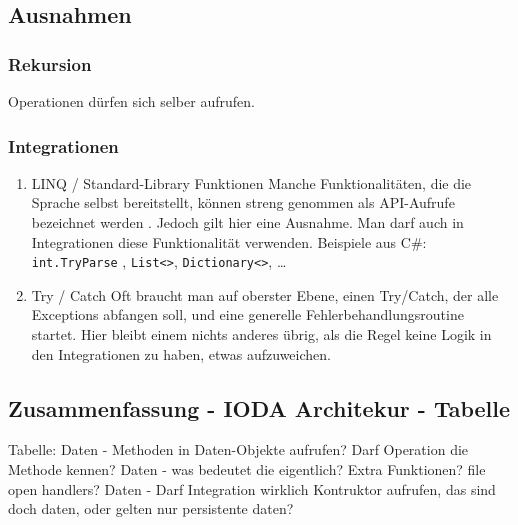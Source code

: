 \documentclass[11pt]{article}
\begin{document}
\subsection{Ausnahmen}
\label{sec:orgheadline41}
\subsubsection{Rekursion}
\label{sec:orgheadline37}
Operationen dürfen sich selber aufrufen.
\subsubsection{Integrationen}
\label{sec:orgheadline40}

\begin{enumerate}
\item LINQ / Standard-Library Funktionen
\label{sec:orgheadline38}
Manche Funktionalitäten, die die Sprache selbst bereitstellt, können streng genommen als API-Aufrufe bezeichnet werden
. Jedoch gilt hier eine Ausnahme. Man darf auch in Integrationen diese Funktionalität verwenden.
Beispiele aus C\#:
\texttt{int.TryParse} , \texttt{List<>}, \texttt{Dictionary<>}, \ldots{}

\item Try / Catch
\label{sec:orgheadline39}
Oft braucht man auf oberster Ebene, einen Try/Catch, der alle Exceptions abfangen soll, und eine generelle Fehlerbehandlungsroutine
startet. Hier bleibt einem nichts anderes übrig, als die Regel keine Logik in den Integrationen zu haben, etwas aufzuweichen.
\end{enumerate}


\subsection{Zusammenfassung - IODA Architekur -  Tabelle}
\label{sec:orgheadline43}

Tabelle:
Daten - Methoden in Daten-Objekte aufrufen? Darf Operation die Methode kennen?
Daten - was bedeutet die eigentlich? Extra Funktionen? file open handlers?
Daten - Darf Integration wirklich Kontruktor aufrufen, das sind doch daten, oder gelten nur persistente daten?
\end{document}
